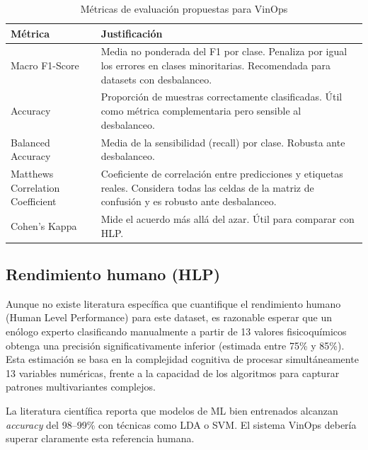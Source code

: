 \begin{table}[H]
    \centering
    \caption{M\'etricas de evaluaci\'on propuestas para VinOps}
    \small
    \begin{tabular}{p{3cm} p{8.5cm}}
        \toprule
        \textbf{M\'etrica} & \textbf{Justificaci\'on} \\
        \midrule
        Macro F1-Score
            & Media no ponderada del F1 por clase. Penaliza por igual los errores
              en clases minoritarias. Recomendada para datasets con desbalanceo. \\[6pt]
        Accuracy
            & Proporci\'on de muestras correctamente clasificadas. \'Util como
              m\'etrica complementaria pero sensible al desbalanceo. \\[6pt]
        Balanced Accuracy
            & Media de la sensibilidad (recall) por clase. Robusta ante desbalanceo. \\[6pt]
        Matthews Correlation Coefficient
            & Coeficiente de correlaci\'on entre predicciones y etiquetas reales.
              Considera todas las celdas de la matriz de confusi\'on y es robusto
              ante desbalanceo. \\[6pt]
        Cohen's Kappa
            & Mide el acuerdo m\'as all\'a del azar. \'Util para comparar con HLP. \\
        \bottomrule
    \end{tabular}
    \label{tab:metricas}
\end{table}

\subsection{Rendimiento humano (HLP)}

Aunque no existe literatura espec\'ifica que cuantifique el rendimiento humano
(Human Level Performance) para este dataset, es razonable esperar que un
en\'ologo experto clasificando manualmente a partir de 13 valores fisicoqu\'imicos
obtenga una precisi\'on significativamente inferior (estimada entre
75\% y 85\%). Esta estimaci\'on se basa en la complejidad cognitiva de procesar simult\'aneamente
13 variables num\'ericas, frente a la capacidad
de los algoritmos para capturar patrones multivariantes complejos. 

La literatura cient\'ifica reporta que modelos de ML bien
entrenados alcanzan \textit{accuracy} del 98--99\% con t\'ecnicas como LDA
o SVM. El sistema VinOps deber\'ia superar claramente esta referencia humana.

